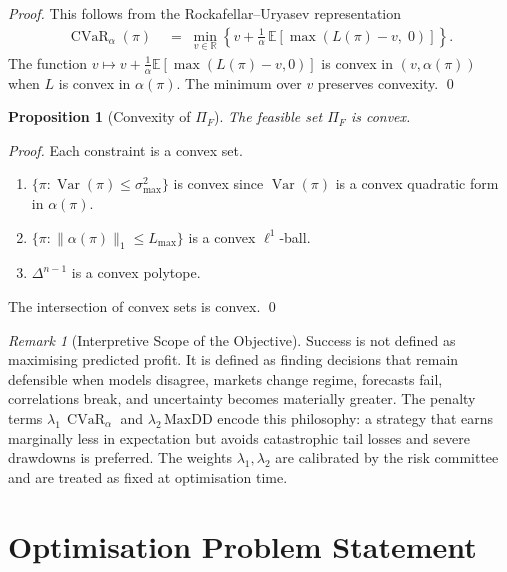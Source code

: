 \documentclass[12pt,openany]{book}
\newcommand{\MaxDD}{\mathrm{MaxDD}}
\newcommand{\E}{\mathbb{E}}
\numberwithin{equation}{chapter}
\theoremstyle{plain}
\newtheorem{proposition}[theorem]{Proposition}
\theoremstyle{definition}
\theoremstyle{remark}
\newtheorem{remark}[theorem]{Remark}
\numberwithin{equation}{chapter}
\theoremstyle{plain}
\DeclareMathOperator{\CVaR}{CVaR}
\DeclareMathOperator{\Var}{Var}
\begin{document}
\begin{proof}
This follows from the Rockafellar--Uryasev representation
\begin{align}
  \CVaR_\alpha(\pi)
  &\;=\;
  \min_{v \in \mathbb{R}}
  \left\{
    v + \frac{1}{\alpha}\,
    \E\!\left[\max\!\left(L(\pi) - v,\; 0\right)\right]
  \right\}.
  \label{eq:CVaR-RU}
\end{align}
The function $v \mapsto v + \frac{1}{\alpha}\E[\max(L(\pi)-v,0)]$ is
convex in $(v, \alpha(\pi))$ when $L$ is convex in $\alpha(\pi)$.
The minimum over $v$ preserves convexity.  \qed
\end{proof}

\begin{proposition}[Convexity of $\Pi_F$]
\label{prop:feasible-convex}
The feasible set $\Pi_F$ is convex.
\end{proposition}

\begin{proof}
Each constraint is a convex set.
\begin{enumerate}
  \item $\{\pi : \Var(\pi) \leq \sigma_{\max}^2\}$ is convex since
        $\Var(\pi)$ is a convex quadratic form in $\alpha(\pi)$.
  \item $\{\pi : \|\alpha(\pi)\|_1 \leq L_{\max}\}$ is a convex
        $\ell^1$-ball.
  \item $\Delta^{n-1}$ is a convex polytope.
\end{enumerate}
The intersection of convex sets is convex.  \qed
\end{proof}

\begin{remark}[Interpretive Scope of the Objective]
\label{rem:obj-scope}
Success is not defined as maximising predicted profit.  It is defined
as finding decisions that remain defensible when models disagree,
markets change regime, forecasts fail, correlations break, and
uncertainty becomes materially greater.  The penalty terms
$\lambda_1\,\CVaR_\alpha$ and $\lambda_2\,\MaxDD$ encode this
philosophy: a strategy that earns marginally less in expectation but
avoids catastrophic tail losses and severe drawdowns is preferred.
The weights $\lambda_1, \lambda_2$ are calibrated by the risk
committee and are treated as fixed at optimisation time.
\end{remark}

\section{Optimisation Problem Statement}
\label{sec:obj-optim}
\end{document}
